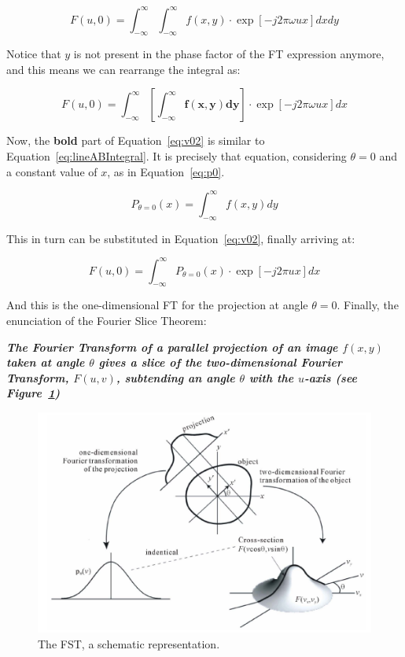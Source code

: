 \begin{equation}
    \label{eq:v0}
    F(u, 0) = \int_{-\infty}^{\infty} \int_{-\infty}^{\infty} f(x, y)
    \cdot \exp \left[  -j 2\pi  \omega ux \right] dx dy
\end{equation}

Notice that $y$ is not present in the phase factor of the \gls{FT}
expression anymore, and this means we can rearrange the integral as:

\begin{equation}
    \label{eq:v02}
    F(u, 0) = \int_{-\infty}^{\infty} \left[ \mathbf{\int_{-\infty}^{\infty}
    f(x, y) dy }\right] \cdot \exp \left[  -j 2\pi  \omega ux \right] dx 
\end{equation}

Now, the \textbf{bold} part of Equation~\ref{eq:v02} is similar to
Equation~\ref{eq:lineABIntegral}. It is precisely that equation,
considering $\theta=0$ and a constant value of $x$, as in
Equation~\ref{eq:p0}.

\begin{equation}
    \label{eq:p0}
    P_{\theta=0} (x) = \int_{-\infty}^{\infty} f(x, y) dy
\end{equation}

This in turn can be substituted in Equation~\ref{eq:v02}, finally
arriving at:

\begin{equation}
    \label{eq:FTP}
    F(u, 0) = \int_{-\infty}^{\infty} P_{\theta=0} (x) \cdot \exp \left[
    -j 2\pi ux \right] dx
\end{equation}

And this is the one-dimensional \gls{FT} for the projection at angle
$\theta=0$. Finally, the enunciation of the Fourier Slice Theorem:
\begin{center}
    \textbf{
    \emph{
        The Fourier Transform of a parallel projection  of an image $f(x,
        y)$ taken at angle $\theta$ gives a slice of the two-dimensional
        Fourier Transform, $F(u, v)$, subtending an angle $\theta$ with the
        $u$-axis (see Figure~\ref{fig:fst})
    }}
\end{center}

\begin{figure}[htpb]
    \centering
    \includegraphics[width = .8\textwidth]{img/fst.png}    
    \caption{The \gls{FST}, a schematic representation.}
    \label{fig:fst}
\end{figure}

